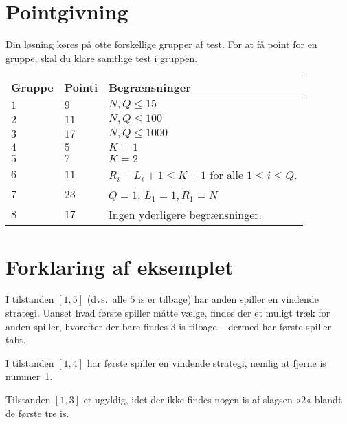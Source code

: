 \section*{Pointgivning}
Din løsning køres på otte forskellige grupper af test.
For at få point for en gruppe, skal du klare samtlige test i gruppen.

\noindent
\begin{tabular}{| l | l | l |}
\hline
Gruppe & Pointi    & Begrænsninger \\ \hline
$1$     & $9$          &  $N,Q \le 15$ \\ \hline
$2$     & $11$         &  $N,Q \le 100$  \\ \hline
$3$     & $17$         &  $N,Q \le 1000$  \\ \hline
$4$     & $5$          &  $K=1$  \\ \hline
$5$     & $7$          &  $K=2$  \\ \hline
$6$     & $11$         &  $R_i - L_i + 1 \le K+1$ for alle $1 \le i \le Q$. \\ \hline
$7$     & $23$         &  $Q=1$, $L_1=1, R_1=N$ \\ \hline
$8$     & $17$         &  Ingen yderligere begrænsninger. \\ \hline
\end{tabular}

\section*{Forklaring af eksemplet}
I tilstanden $[1,5]$ (dvs.\ alle $5$ is er tilbage) har anden spiller en vindende strategi.
Uanset hvad første spiller måtte vælge, findes der et muligt træk for anden spiller, hvorefter der bare findes $3$ is tilbage -- dermed har første spiller tabt.

I tilstanden $[1,4]$ har første spiller en vindende strategi, nemlig at fjerne is nummer~1.

Tilstanden $[1,3]$ er ugyldig, idet der ikke findes nogen is af slagsen »$2$« blandt de første tre is.
